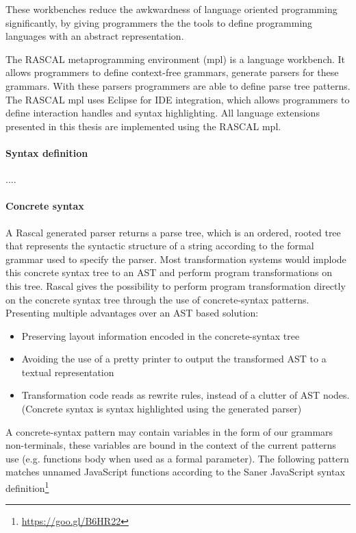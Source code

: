 These workbenches reduce the awkwardness of language oriented programming\cite{Ward1994} significantly, by giving programmers the the tools to define programming languages with an abstract representation.

The RASCAL\cite{Klint} metaprogramming environment (mpl) is a language workbench. It allows programmers to define context-free grammars, generate parsers for these grammars. With these parsers programmers are able to define parse tree patterns. The RASCAL mpl uses Eclipse for IDE integration, which allows programmers to define interaction handles and syntax highlighting. All language extensions presented in this thesis are implemented using the RASCAL mpl.

\paragraph{Syntax definition}
....

\paragraph{Concrete syntax}
A Rascal generated parser returns a parse tree, which is an ordered, rooted tree that represents the syntactic structure of a string according to the formal grammar used to specify the parser. Most transformation systems would implode this concrete syntax tree to an AST and perform program transformations on this tree. Rascal gives the possibility to perform program transformation directly on the concrete syntax tree through the use of concrete-syntax patterns. Presenting multiple advantages over an AST based solution:
\begin{itemize}
	\item Preserving layout information encoded in the concrete-syntax tree
	\item Avoiding the use of a pretty printer to output the transformed AST to a textual representation
	\item Transformation code reads as rewrite rules, instead of a clutter of AST nodes. (Concrete syntax is syntax highlighted using the generated parser)
\end{itemize}
A concrete-syntax pattern may contain variables in the form of our grammars non-terminals, these variables are bound in the context of the current patterns use (e.g. functions body when used as a formal parameter). The following pattern matches unnamed JavaScript functions according to the Saner JavaScript syntax definition\footnote{\url{https://goo.gl/B6HR22}}

